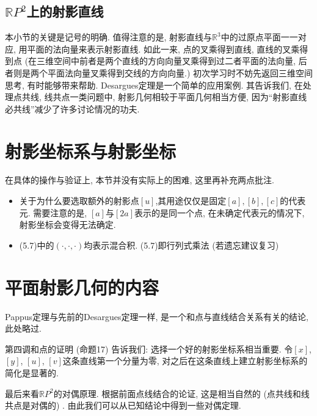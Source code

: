 \documentclass[./main.tex]{subfiles}
\begin{document}
\subsection{\texorpdfstring{\(\mathbb{R}P ^{2}\)}{RP\^{}2}上的射影直线}
本小节的关键是记号的明确. 值得注意的是, 射影直线与$\mathbb{R}^{3}$中的过原点平面一一对应, 用平面的法向量来表示射影直线. 如此一来, 点的叉乘得到直线, 直线的叉乘得到点 (在三维空间中前者是两个直线的方向向量叉乘得到过二者平面的法向量, 后者则是两个平面法向量叉乘得到交线的方向向量.) 初次学习时不妨先返回三维空间思考, 有时能够带来帮助. Desargues定理是一个简单的应用案例. 其告诉我们, 在处理点共线, 线共点一类问题中, 射影几何相较于平面几何相当方便, 因为``射影直线必共线''减少了许多讨论情况的功夫. 
\section{射影坐标系与射影坐标}
在具体的操作与验证上, 本节并没有实际上的困难, 这里再补充两点批注.
\begin{itemize}
\item 关于为什么要选取额外的射影点$[u]$,其用途仅仅是固定$[a],[b],[c]$的代表元. 需要注意的是, $[a]$与$[2a]$表示的是同一个点, 在未确定代表元的情况下, 射影坐标会变得无法确定. 

\item (5.7)中的$\left(\cdot,\cdot,\cdot\right) $均表示混合积. (5.7)即行列式乘法 (若遗忘建议复习) 
\end{itemize}
\section{平面射影几何的内容}
Pappus定理与先前的Desargues定理一样, 是一个和点与直线结合关系有关的结论, 此处略过.

第四调和点的证明 (命题17) 告诉我们: 选择一个好的射影坐标系相当重要. 令$[x]$, $[y]$, $[u]$, $[v]$这条直线第一个分量为零, 对之后在这条直线上建立射影坐标系的简化是显著的. 

最后来看$\mathbb{R}P ^{2}$的对偶原理. 根据前面点线结合的论证, 这是相当自然的 (点共线和线共点是对偶的) . 由此我们可以从已知结论中得到一些对偶定理. 
\end{document}
